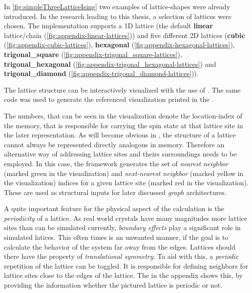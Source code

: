 In \autoref{fig:simpleThreeLatticeIsing} two examples of lattice-shapes were already introduced.
In the research leading to this thesis, a selection of lattices were chosen.
The implementation supports a 1D lattice (the default \textbf{linear} lattice/chain  (\autoref{fig:appendix-linear-lattices})) and five different 2D lattices 
(\textbf{cubic} (\autoref{fig:appendix-cubic-lattices}), \textbf{hexagonal} (\autoref{fig:appendix-hexagonal-lattices}), \textbf{trigonal\_square} (\autoref{fig:appendix-trigonal_square-lattices}), \textbf{trigonal\_hexagonal} (\autoref{fig:appendix-trigonal_hexagonal-lattices}) and \textbf{trigonal\_diamond} (\autoref{fig:appendix-trigonal_diamond-lattices})).

The lattice structure can be interactively visualized with the use of \cite{selfPhysics} .
The same code was used to generate the referenced visualization printed in the .

The numbers, that can be seen in the visualization denote the location-index of the memory, that is responsible for carrying the spin state at that lattice site in the later representation. As will become obvious in , the structure of a lattice cannot always be represented directly analogous in memory. Therefore an alternative way of addressing lattice sites and theirs surroundings needs to be employed.
In this case, the framework generates the set of \emph{nearest neighbor} (marked green in the visualization) and \emph{next-nearest neighbor} (marked yellow in the visualization) indices for a given lattice site (marked red in the visualization). These are used as structural inputs for later discussed \emph{graph} architectures.

A quite important feature for the physical aspect of the calculation is the \emph{periodicity} of a lattice. 
As real world crystals have many magnitudes more lattice sites than can be simulated currently, \emph{boundary effects} play a significant role in simulated latices.
This often times is an unwanted manner, if the goal is to calculate the behavior of the system far away from the edges. 
Lattices should there have the property of \emph{translational symmetry}. 
To aid with this, a \emph{periodic} repetition of the lattice can be toggled. 
It is responsible for defining neighbors for lattice sites close to the edges of the lattice.
The  in the appendix shows this, by providing the information whether the pictured lattice is periodic or not.

